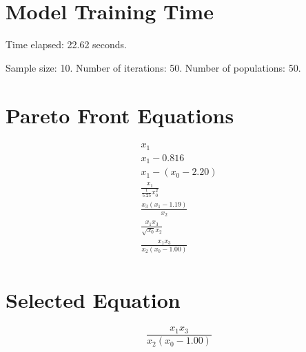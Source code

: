 \documentclass{article}
\begin{document}
\section*{Model Training Time}
Time elapsed: 22.62 seconds.

Sample size: 10.
Number of iterations: 50.
Number of populations: 50.

\section*{Pareto Front Equations}
\begin{align*}
x_{1} \\
x_{1} - 0.816 \\
x_{1} - \left(x_{0} - 2.20\right) \\
\frac{x_{1}}{\frac{1}{5.25} x_{0}^{2}} \\
\frac{x_{3} \left(x_{1} - 1.19\right)}{x_{2}} \\
\frac{x_{1} x_{3}}{\sqrt{x_{0}} x_{2}} \\
\frac{x_{1} x_{3}}{x_{2} \left(x_{0} - 1.00\right)} \\
\end{align*}

\section*{Selected Equation}
\[ \frac{x_{1} x_{3}}{x_{2} \left(x_{0} - 1.00\right)} \]
\end{document}

